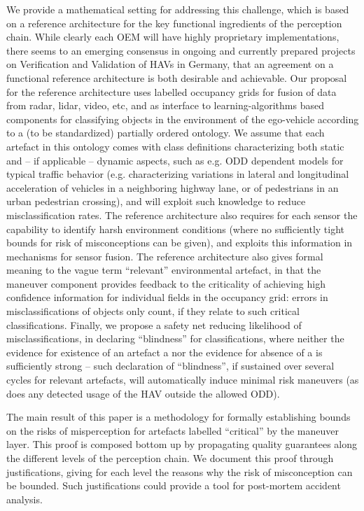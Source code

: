 {We provide a mathematical setting for addressing this challenge, which is based on a reference architecture for the key functional ingredients of the perception chain. While clearly each OEM will have highly proprietary implementations, there seems to an emerging consensus in ongoing and currently prepared projects on Verification and Validation of HAVs in Germany, that an agreement on a functional reference architecture is both desirable and achievable. Our proposal for the reference architecture uses labelled occupancy grids for fusion of data from radar, lidar, video, etc, and as interface to learning-algorithms based components for classifying objects in the environment of the ego-vehicle according to a (to be standardized) partially ordered ontology. We assume that each artefact in this ontology comes with class definitions characterizing both static and – if applicable – dynamic aspects, such as e.g. ODD dependent models for typical traffic behavior (e.g. characterizing variations in lateral and longitudinal acceleration of vehicles in a neighboring highway lane, or of pedestrians in an urban pedestrian crossing), and will exploit such knowledge to reduce misclassification rates. The reference architecture also requires for each sensor the capability to identify harsh environment conditions (where no sufficiently tight bounds for risk of misconceptions can be given), and exploits this information in mechanisms for sensor fusion. The reference architecture also gives formal meaning to the vague term \enquote{relevant} environmental artefact, in that the maneuver component provides feedback to the criticality of achieving high confidence information for individual fields in the occupancy grid: errors in misclassifications of objects only count, if they relate to such critical classifications. Finally, we propose a safety net reducing likelihood of misclassifications, in declaring \enquote{blindness} for classifications, where neither the evidence for existence of an artefact a nor the evidence for absence of a is sufficiently strong – such declaration of \enquote{blindness}, if sustained over several cycles for relevant artefacts, will automatically induce minimal risk maneuvers (as does any detected usage of the HAV outside the allowed ODD).

The main result of this paper is a methodology for formally establishing bounds on the risks of misperception for artefacts labelled \enquote{critical} by the maneuver layer. This proof is composed bottom up by propagating quality guarantees along the different levels of the perception chain. We document this proof through justifications, giving for each level the reasons why the risk of misconception can be bounded. Such justifications could provide a tool for post-mortem accident analysis.

}
